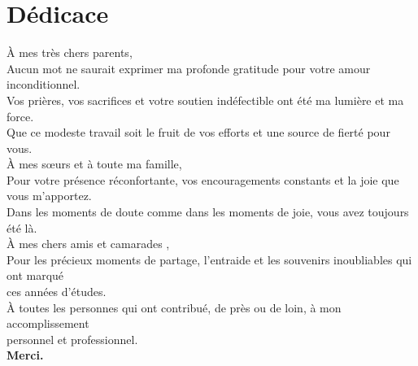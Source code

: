\chapter*{D\'edicace}
\thispagestyle{empty}

\vspace*{1.5cm}
\begin{center}
\itshape

À mes très chers parents,\\[0.4cm]
Aucun mot ne saurait exprimer ma profonde gratitude pour votre amour inconditionnel.\\
Vos prières, vos sacrifices et votre soutien indéfectible ont été ma lumière et ma force.\\
Que ce modeste travail soit le fruit de vos efforts et une source de fierté pour vous.\\[1cm]

À mes s\oe{}urs et à toute ma famille,\\[0.4cm]
Pour votre présence réconfortante, vos encouragements constants et la joie que vous m'apportez.\\
Dans les moments de doute comme dans les moments de joie, vous avez toujours été là.\\[1cm]

À mes chers amis et camarades ,\\[0.4cm]
Pour les précieux moments de partage, l'entraide et les souvenirs inoubliables qui ont marqué\\
ces années d'études.\\[1cm]

À toutes les personnes qui ont contribué, de près ou de loin, à mon accomplissement\\
personnel et professionnel.\\[1.5cm]

\textbf{\Large Merci.}

\end{center}